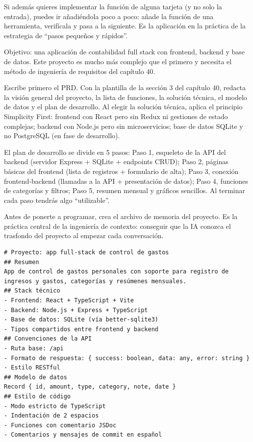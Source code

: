 Si además quieres implementar la función de alguna tarjeta (y no solo la entrada), puedes ir añadiéndola poco a poco: añade la función de una herramienta, verifícala y pasa a la siguiente. Es la aplicación en la práctica de la estrategia de “pasos pequeños y rápidos”.



Objetivo: una aplicación de contabilidad full stack con frontend, backend y base de datos. Este proyecto es mucho más complejo que el primero y necesita el método de ingeniería de requisitos del capítulo 40.

Escribe primero el PRD. Con la plantilla de la sección 3 del capítulo 40, redacta la visión general del proyecto, la lista de funciones, la solución técnica, el modelo de datos y el plan de desarrollo. Al elegir la solución técnica, aplica el principio Simplicity First: frontend con React pero sin Redux ni gestiones de estado complejas; backend con Node.js pero sin microservicios; base de datos SQLite y no PostgreSQL (en fase de desarrollo).

El plan de desarrollo se divide en 5 pasos: Paso 1, esqueleto de la API del backend (servidor Express + SQLite + endpoints CRUD); Paso 2, páginas básicas del frontend (lista de registros + formulario de alta); Paso 3, conexión frontend-backend (llamadas a la API + presentación de datos); Paso 4, funciones de categorías y filtros; Paso 5, resumen mensual y gráficos sencillos. Al terminar cada paso tendrás algo “utilizable”.


Antes de ponerte a programar, crea el archivo de memoria del proyecto. Es la práctica central de la ingeniería de contexto: conseguir que la IA conozca el trasfondo del proyecto al empezar cada conversación.

\begin{lstlisting}
# Proyecto: app full-stack de control de gastos
## Resumen
App de control de gastos personales con soporte para registro de ingresos y gastos, categorías y resúmenes mensuales.
## Stack técnico
- Frontend: React + TypeScript + Vite
- Backend: Node.js + Express + TypeScript
- Base de datos: SQLite (vía better-sqlite3)
- Tipos compartidos entre frontend y backend
## Convenciones de la API
- Ruta base: /api
- Formato de respuesta: { success: boolean, data: any, error: string }
- Estilo RESTful
## Modelo de datos
Record { id, amount, type, category, note, date }
## Estilo de código
- Modo estricto de TypeScript
- Indentación de 2 espacios
- Funciones con comentario JSDoc
- Comentarios y mensajes de commit en español
\end{lstlisting}

